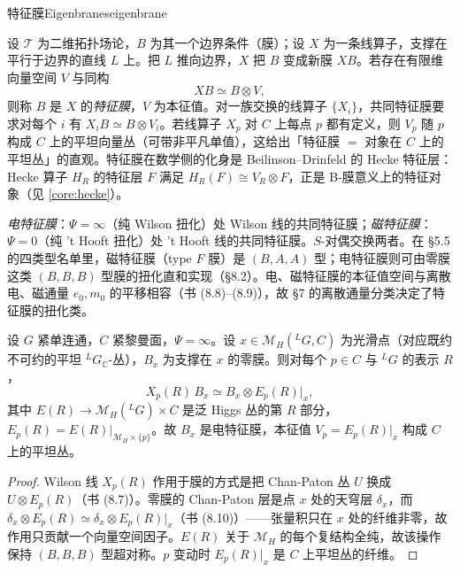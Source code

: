 \begin{centry}{特征膜}{Eigenbranes}{eigenbrane}

\begin{definition}[特征膜]
设 $\mathcal{T}$ 为二维拓扑场论，$B$ 为其一个边界条件（膜）；设 $X$ 为一条线算子，支撑在平行于边界的直线 $L$ 上。把 $L$ 推向边界，$X$ 把 $B$ 变成新膜 $XB$。若存在有限维向量空间 $V$ 与同构
\[
XB\simeq B\otimes V,
\]
则称 $B$ 是 $X$ 的\emph{特征膜}，$V$ 为本征值。对一族交换的线算子 $\{X_i\}$，共同特征膜要求对每个 $i$ 有 $X_iB\simeq B\otimes V_i$。若线算子 $X_p$ 对 $C$ 上每点 $p$ 都有定义，则 $V_p$ 随 $p$ 构成 $C$ 上的平坦向量丛（可带非平凡单值），这给出「特征膜 $=$ 对象在 $C$ 上的平坦丛」的直观。特征膜在数学侧的化身是 Beilinson--Drinfeld 的 Hecke 特征层：Hecke 算子 $H_R$ 的特征层 $F$ 满足 $H_R(F)\cong V_R\otimes F$，正是 B-膜意义上的特征对象（见 \ref{core:hecke}）。

\emph{电特征膜}：$\Psi=\infty$（纯 Wilson 扭化）处 Wilson 线的共同特征膜；\emph{磁特征膜}：$\Psi=0$（纯 't Hooft 扭化）处 't Hooft 线的共同特征膜。$S$-对偶交换两者。在 §5.5 的四类型名单里，磁特征膜（type $F$ 膜）是 $(B,A,A)$ 型；电特征膜则可由零膜这类 $(B,B,B)$ 型膜的扭化直和实现（\S8.2）。电、磁特征膜的本征值空间与离散电、磁通量 $e_0,m_0$ 的平移相容（书 (8.8)--(8.9)），故 §7 的离散通量分类决定了特征膜的扭化类。
\end{definition}

\begin{theorem}
设 $G$ 紧单连通，$C$ 紧黎曼面，$\Psi=\infty$。设 $x\in\mathcal M_H({}^L G,C)$ 为光滑点（对应既约不可约的平坦 ${}^L G_{\mathbb{C}}$-丛），$B_x$ 为支撑在 $x$ 的零膜。则对每个 $p\in C$ 与 ${}^L G$ 的表示 $R$，
\[
X_p(R)\,B_x\simeq B_x\otimes E_p(R)|_x,
\]
其中 $E(R)\to\mathcal M_H({}^L G)\times C$ 是泛 Higgs 丛的第 $R$ 部分，$E_p(R)=E(R)|_{\mathcal M_H\times\{p\}}$。故 $B_x$ 是电特征膜，本征值 $V_p=E_p(R)|_x$ 构成 $C$ 上的平坦丛。
\end{theorem}
\begin{proof}
Wilson 线 $X_p(R)$ 作用于膜的方式是把 Chan-Paton 丛 $U$ 换成 $U\otimes E_p(R)$（书 (8.7)）。零膜的 Chan-Paton 层是点 $x$ 处的天穹层 $\delta_x$，而 $\delta_x\otimes E_p(R)\simeq\delta_x\otimes E_p(R)|_x$（书 (8.10)）——张量积只在 $x$ 处的纤维非零，故作用只贡献一个向量空间因子。$E(R)$ 关于 $\mathcal M_H$ 的每个复结构全纯，故该操作保持 $(B,B,B)$ 型超对称。$p$ 变动时 $E_p(R)|_x$ 是 $C$ 上平坦丛的纤维。
\end{proof}


\end{centry}
